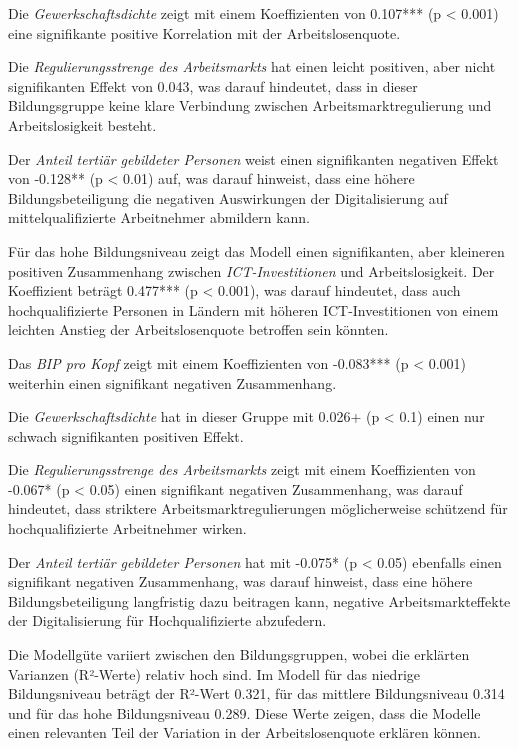 Die \textit{Gewerkschaftsdichte} zeigt mit einem Koeffizienten von 0.107*** (p < 0.001) eine 
signifikante positive Korrelation mit der Arbeitslosenquote.

Die \textit{Regulierungsstrenge des Arbeitsmarkts} hat einen leicht positiven, aber nicht signifikanten 
Effekt von 0.043, was darauf hindeutet, dass in dieser Bildungsgruppe keine klare Verbindung zwischen 
Arbeitsmarktregulierung und Arbeitslosigkeit besteht.

Der \textit{Anteil tertiär gebildeter Personen} weist einen signifikanten negativen Effekt von -0.128** 
(p < 0.01) auf, was darauf hinweist, dass eine höhere Bildungsbeteiligung die negativen Auswirkungen 
der Digitalisierung auf mittelqualifizierte Arbeitnehmer abmildern kann.

Für das hohe Bildungsniveau zeigt das Modell einen signifikanten, aber kleineren positiven 
Zusammenhang zwischen \textit{\ac{ICT}-Investitionen} und Arbeitslosigkeit. Der Koeffizient beträgt 
0.477*** (p < 0.001), was darauf hindeutet, dass auch hochqualifizierte Personen in Ländern mit 
höheren \ac{ICT}-Investitionen von einem leichten Anstieg der Arbeitslosenquote betroffen sein 
könnten.

Das \textit{\ac{BIP} pro Kopf} zeigt mit einem Koeffizienten von -0.083*** (p < 0.001) weiterhin 
einen signifikant negativen Zusammenhang.

Die \textit{Gewerkschaftsdichte} hat in dieser Gruppe mit 0.026+ (p < 0.1) einen nur schwach 
signifikanten positiven Effekt.

Die \textit{Regulierungsstrenge des Arbeitsmarkts} zeigt mit einem Koeffizienten von -0.067* 
(p < 0.05) einen signifikant negativen Zusammenhang, was darauf hindeutet, dass striktere 
Arbeitsmarktregulierungen möglicherweise schützend für hochqualifizierte Arbeitnehmer wirken.

Der \textit{Anteil tertiär gebildeter Personen} hat mit -0.075* (p < 0.05) ebenfalls einen 
signifikant negativen Zusammenhang, was darauf hinweist, dass eine höhere Bildungsbeteiligung 
langfristig dazu beitragen kann, negative Arbeitsmarkteffekte der Digitalisierung für 
Hochqualifizierte abzufedern.

Die Modellgüte variiert zwischen den Bildungsgruppen, wobei die erklärten Varianzen (R²-Werte) 
relativ hoch sind. Im Modell für das niedrige Bildungsniveau beträgt der R²-Wert 0.321, für das 
mittlere Bildungsniveau 0.314 und für das hohe Bildungsniveau 0.289. Diese Werte zeigen, dass die 
Modelle einen relevanten Teil der Variation in der Arbeitslosenquote erklären können.

